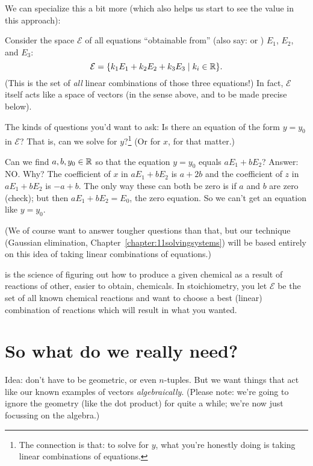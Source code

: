 We can specialize this a bit more (which also helps us start to
see the value in this approach):

Consider the space $\mathcal{E}$ of all equations ``obtainable from'' (also say:   or ) $E_1$, $E_2$, and $E_3$:
$$
\mathcal{E} = \{ k_1E_1 + k_2 E_2 + k_3 E_3 \;| \; k_i \in \mathbb{R}\}.
$$
(This is the set of \emph{all} linear combinations  of those three equations!)
In fact, $\mathcal{E}$ itself acts like a space of vectors (in
the sense above, and to be made precise below).

The kinds of questions you'd want to ask:
Is there an equation of the form $y=y_0$ in $\mathcal{E}$? That is,
can we solve for $y$?\footnote{The 
connection is that: to solve for $y$, what you're honestly
doing is taking linear combinations of equations.}  (Or for $x$, for that matter.) 

\begin{myexample}
Can we find $a,b,y_0\in\mathbb{R}$ so that the equation $y=y_0$
equals $aE_1+bE_2$?  Answer: NO.  Why?  The coefficient
of $x$ in $aE_1+bE_2$ is $a+2b$ and the coefficient of
$z$ in $aE_1+bE_2$ is $-a+b$.  The only way these
can both be zero is if $a$ and $b$ are zero (check);
but then $aE_1+bE_2 = E_0$, the zero equation.  So 
we can't get an equation like $y=y_0$. \end{myexample}

(We of course want to answer tougher questions than that,
but our technique (Gaussian elimination, Chapter~\ref{chapter:11solvingsystems}) will
be based entirely on this idea of taking linear combinations
of equations.)

 is the science of figuring out how to
produce a given chemical as a result of reactions of other,
easier to obtain, chemicals.  In stoichiometry, you let $\mathcal{E}$
be the set of all known chemical reactions and want to choose
a best (linear) combination of reactions which will result in
what you wanted.

 

\section{So what do we really need?}
Idea:   don't have to be geometric, or even $n$-tuples.
But we want things that act like our known examples of vectors
\emph{algebraically}.  (Please note: we're going to ignore the
geometry (like the dot product) for quite a while; we're now
just focussing on the algebra.)

